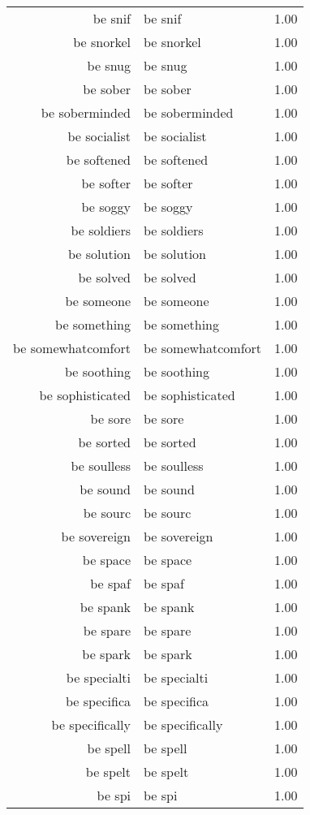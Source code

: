 \begin{table}[ht]
\begin{tabular}{rlr}
  be snif & be snif & 1.00 \\ 
  be snorkel & be snorkel & 1.00 \\ 
  be snug & be snug & 1.00 \\ 
  be sober & be sober & 1.00 \\ 
  be soberminded & be soberminded & 1.00 \\ 
  be socialist & be socialist & 1.00 \\ 
  be softened & be softened & 1.00 \\ 
  be softer & be softer & 1.00 \\ 
  be soggy & be soggy & 1.00 \\ 
  be soldiers & be soldiers & 1.00 \\ 
  be solution & be solution & 1.00 \\ 
  be solved & be solved & 1.00 \\ 
  be someone & be someone & 1.00 \\ 
  be something & be something & 1.00 \\ 
  be somewhatcomfort & be somewhatcomfort & 1.00 \\ 
  be soothing & be soothing & 1.00 \\ 
  be sophisticated & be sophisticated & 1.00 \\ 
  be sore & be sore & 1.00 \\ 
  be sorted & be sorted & 1.00 \\ 
  be soulless & be soulless & 1.00 \\ 
  be sound & be sound & 1.00 \\ 
  be sourc & be sourc & 1.00 \\ 
  be sovereign & be sovereign & 1.00 \\ 
  be space & be space & 1.00 \\ 
  be spaf & be spaf & 1.00 \\ 
  be spank & be spank & 1.00 \\ 
  be spare & be spare & 1.00 \\ 
  be spark & be spark & 1.00 \\ 
  be specialti & be specialti & 1.00 \\ 
  be specifica & be specifica & 1.00 \\ 
  be specifically & be specifically & 1.00 \\ 
  be spell & be spell & 1.00 \\ 
  be spelt & be spelt & 1.00 \\ 
  be spi & be spi & 1.00 \\ 

\end{tabular}
\end{table}
